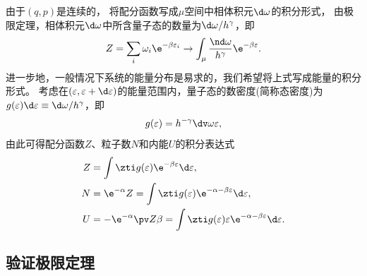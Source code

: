 \begin{corollary}
	由于$(q,p)$是连续的，
	将配分函数写成$\mu$空间中相体积元$\d\omega$的积分形式，
	由极限定理，相体积元$\d\omega$中所含量子态的数量为$\d\omega/h^\gamma$，即
	\[
		Z=\sum_i \omega_i\e^{-\beta\varepsilon_i}\to \int_\mu\frac{\nd\omega}{h^\gamma}\e^{-\beta\varepsilon}.
	\]
	进一步地，一般情况下系统的能量分布是易求的，我们希望将上式写成能量的积分形式。
	考虑在$(\varepsilon,\varepsilon+\d\varepsilon)$的能量范围内，量子态的数密度(简称态密度)为
	$g(\varepsilon)\d\varepsilon\equiv\d\omega/h^\gamma$，即
	\begin{equation}
		g(\varepsilon)=h^{-\gamma}\dv\omega\varepsilon,
	\end{equation}
	由此可得配分函数$Z$、粒子数$N$和内能$U$的积分表达式
	\begin{subequations}
		\begin{align}
			Z&=\int\zti g(\varepsilon)\e^{-\beta\varepsilon}\d\varepsilon,\\
			N&=\e^{-\alpha}Z=\int\zti g(\varepsilon)\e^{-\alpha-\beta\varepsilon}\d\varepsilon,\\
			U&=-\e^{-\alpha}\pv Z\beta=\int\zti g(\varepsilon)\varepsilon\e^{-\alpha-\beta\varepsilon}\d\varepsilon.
		\end{align}
	\end{subequations}
\end{corollary}

\subsection*{验证极限定理}


